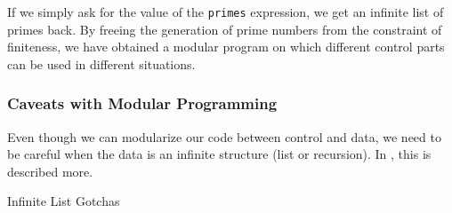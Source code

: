 If we simply ask for the value of the \texttt{primes} expression, we get an infinite list of primes back.
By freeing the generation of prime numbers from the constraint of finiteness, we have obtained a modular program on which different control parts can be used in different situations.

\subsubsection{Caveats with Modular Programming}\label{subsubsec:Modular_Programming_Caveats}
Even though we can modularize our code between control and data, we need to be careful when the data is an infinite structure (list or recursion).
In , this is described more.

\begin{listing}[h!tbp]
\caption{Infinite List Gotchas}
\label{lst:Infinite_List_Gotchas}
\end{listing}

